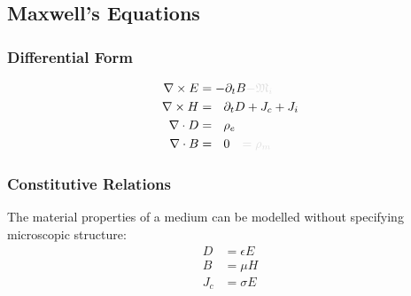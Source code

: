 \documentclass{article}
\numberwithin{equation}{section}
\begin{document}
    \subsection{Maxwell's Equations}
        \subsubsection{Differential Form}
            \begin{subequations}\label{eq:Maxwell}
                \begin{align}
                    \nabla \times E &= - \partial_t B \begingroup \textcolor{vanish}{
                        - \mathfrak{M}_i } \endgroup \label{eq:MaxwellFaraday} \\
                    \nabla \times H &= \ \ \partial_t D + J_{c} + J_{i} 
                        \label{eq:AmpereMaxwell} \\
                    \nabla \cdot D &= \ \ \rho_e \label{eq:GaussElectric} \\
                    \nabla \cdot B &= \ \ 0 \begingroup \textcolor{vanish}{
                        \quad = \rho_m} \endgroup \label{eq:GaussMagnetic}
                \end{align}
            \end{subequations}
        \subsubsection{Constitutive Relations} 
            The material properties of a medium can be modelled without specifying 
            microscopic structure:
            \begin{subequations}\label{eq:Constitutive}
                \begin{align}
                    D &= \epsilon E \label{eq:ConstitutiveElectric} \\ 
                    B &= \mu H \label{eq:ConstitutiveMagnetic} \\
                    J_c &= \sigma E \label{eq:ConstitutiveCurrentDensity}
                \end{align}
            \end{subequations}
\end{document}
